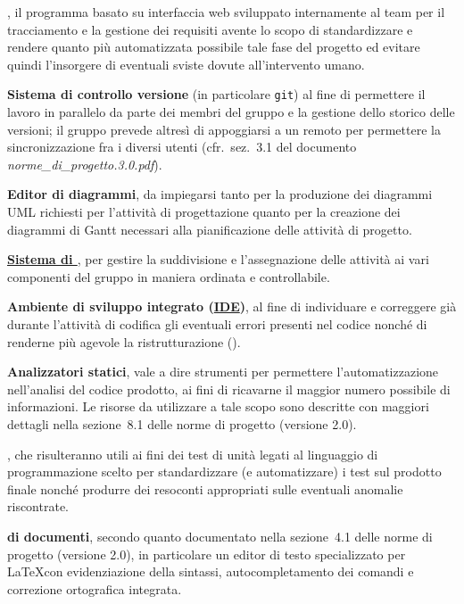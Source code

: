 \begin{description}
\item{\bfseries \manager}, il programma basato su interfaccia web sviluppato internamente al team per il tracciamento e la gestione dei requisiti avente lo scopo di standardizzare e rendere quanto più automatizzata possibile tale fase del progetto ed evitare quindi l'insorgere di eventuali sviste dovute all'intervento umano.

\item{\bfseries Sistema di controllo versione} (in particolare \texttt{git}) al fine di permettere il lavoro in parallelo da parte dei membri del gruppo e la gestione dello storico delle versioni; il gruppo prevede altresì di appoggiarsi a un \underline{} remoto per permettere la sincronizzazione fra i diversi utenti (cfr.~sez.~3.1 del documento \textit{norme\_di\_progetto.3.0.pdf}). 

\item{\bfseries Editor di diagrammi}, da impiegarsi tanto per la produzione dei diagrammi UML richiesti per l'attività di progettazione quanto per la creazione dei diagrammi di Gantt necessari alla pianificazione delle attività di progetto. 

\item{\bfseries \underline{Sistema di }}, per gestire la suddivisione e l'assegnazione delle attività ai vari componenti del gruppo in maniera ordinata e controllabile.

\item{\bfseries Ambiente di sviluppo integrato (\underline{IDE})}, al fine di individuare e correggere già durante l'attività di codifica gli eventuali errori presenti nel codice nonché di renderne più agevole la ristrutturazione ().

\item{\bfseries Analizzatori statici}, vale a dire strumenti per permettere l'automatizzazione nell'analisi del codice prodotto, ai fini di ricavarne il maggior numero possibile di informazioni. Le risorse da utilizzare a tale scopo sono descritte con maggiori dettagli nella sezione~8.1 delle norme di progetto (versione 2.0).

\item{\bfseries {}}, che risulteranno utili ai fini dei test di unità legati al linguaggio di programmazione scelto per standardizzare (e automatizzare) i test sul prodotto finale nonché produrre dei resoconti appropriati sulle eventuali anomalie riscontrate.

\item{\bfseries {} di documenti}, secondo quanto documentato nella sezione~4.1 delle norme di progetto (versione 2.0), in particolare un editor di testo specializzato per \LaTeX con evidenziazione della sintassi, autocompletamento dei comandi e correzione ortografica integrata. 
\end{description}

